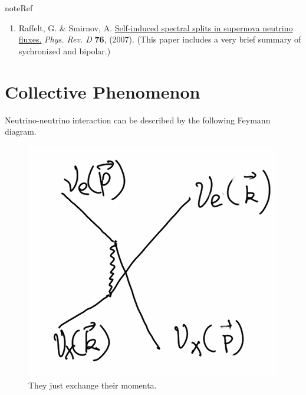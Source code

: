 \documentclass[letterpaper,12pt,english]{sphinxmanual}
\begin{document}
\begin{notice}{note}{Ref}
\begin{enumerate}
\item {} 
Raffelt, G. \& Smirnov, A. \href{http://journals.aps.org/prd/abstract/10.1103/PhysRevD.74.105010}{Self-induced spectral splits in supernova neutrino fluxes.} \emph{Phys. Rev. D} \textbf{76}, (2007). (This paper includes a very brief summary of sychronized and bipolar.)

\end{enumerate}
\end{notice}


\section{Collective Phenomenon}
\label{collective:collective-phenomenon}
Neutrino-neutrino interaction can be described by the following Feymann diagram.
\begin{figure}[htbp]
\centering
\capstart

\includegraphics{refractiveFey.png}
\caption{They just exchange their momenta.}\end{figure}
\end{document}
